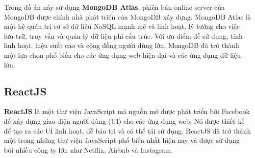 Trong đồ án này sử dụng \textbf{MongoDB Atlas}, phiên bản online server của MongoDB được chính nhà phát triển của MongoDB xây dựng. MongoDB Atlas là một hệ quản trị cơ sở dữ liệu NoSQL mạnh mẽ và linh hoạt, lý tưởng cho việc lưu trữ, truy vấn và quản lý dữ liệu phi cấu trúc. Với ưu điểm dễ sử dụng, tính linh hoạt, hiệu suất cao và cộng đồng người dùng lớn, MongoDB đã trở thành một lựa chọn phổ biến cho các ứng dụng web hiện đại và các ứng dụng dữ liệu lớn.

\subsection{ReactJS}

\textbf{ReactJS} là một thư viện JavaScript mã nguồn mở được phát triển bởi Facebook để xây dựng giao diện người dùng (UI) cho các ứng dụng web. Nó được thiết kế để tạo ra các UI linh hoạt, dễ bảo trì và có thể tái sử dụng. ReactJS đã trở thành một trong những thư viện JavaScript phổ biến nhất hiện nay và được sử dụng bởi nhiều công ty lớn như Netflix, Airbnb và Instagram.


